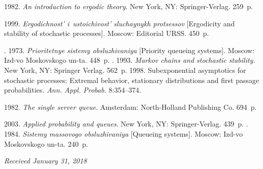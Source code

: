 
  \begin{multicols}{2}

\renewcommand{\bibname}{\protect\rmfamily References}

{\small\frenchspacing
 {%
 \begin{thebibliography}{9}


 1982.  
\textit{An introduction to ergodic theory}. New York, NY: Springer-Verlag. 259~p.

 1999. \textit{Ergodichnost' 
i~ustoichivost' sluchaynykh protsessov} [Ergodicity and stability of 
stochastic processes]. Moscow: Editorial URSS. 450~p.

. 
1973. \textit{Prioritetnye sistemy obsluzhivaniya} [Priority queueing systems].
 Moscow: Izd-vo Moskovskogo un-ta. 448~p.
. 1993.  
\textit{Markov chains and stochastic stability}. New York, NY: Springer Verlag. 562~p.
 1998.  Subexponential asymptotics for stochastic processes: 
Extremal behavior, stationary distributions and first passage probabilities.  
\textit{Ann. Appl. Probab.} 8:354--374.

 1982.  
\textit{The single server queue}. Amsterdam: North-Holland Publishing Co. 694~p.

 2003.  
\textit{Applied probability and queues}. New York, NY: Springer-Verlag. 439~p.
. 1984.  
\textit{Sistemy massovogo obsluzhivaniya} [Queueing systems]. 
Moscow: Izd-vo Moskovskogo un-ta. 240~p.
\end{thebibliography}

 }
 }

\end{multicols}

\vspace*{-3pt}

\hfill{\small\textit{Received January 31, 2018}}



\Contr

